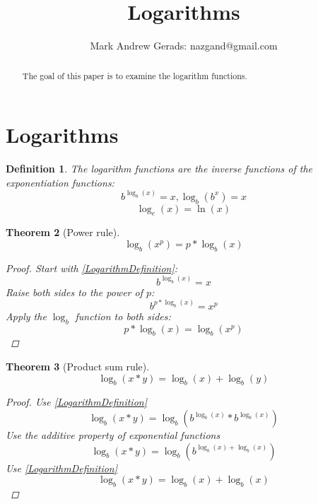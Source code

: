 \documentclass[]{article}
\author{Mark Andrew Gerads: nazgand@gmail.com}
\title{Logarithms}
\newcommand{\pqty}[1]{{\left(#1\right)}}
\newtheorem{theorem}{Theorem}[section]
\newtheorem{definition}[theorem]{Definition}
\numberwithin{equation}{section}
\begin{document}
	
	\maketitle
	
	\begin{abstract}
		The goal of this paper is to examine the logarithm functions.
	\end{abstract}
	
	\section{Logarithms}
	\begin{definition}
		The logarithm functions are the inverse functions of the exponentiation functions:
		\begin{equation}
			\label{LogarithmDefinition}
			b^{\log_b\pqty{x}}=x
			,
			\log_b\pqty{b^x}=x
		\end{equation}
		\begin{equation}
		\log_e\pqty{x}=\ln\pqty{x}
		\end{equation}
	\end{definition}

	\begin{theorem}[Power rule]
		\begin{equation}
		\log_b\pqty{x^p}=p*\log_b\pqty{x}
		\end{equation}
		\begin{proof}
			Start with \eqref{LogarithmDefinition}:
			\begin{equation}
			b^{\log_b\pqty{x}}=x
			\end{equation}
			Raise both sides to the power of \(p\):
			\begin{equation}
			b^{p*\log_b\pqty{x}}=x^p
			\end{equation}
			Apply the \(\log_b\) function to both sides:
			\begin{equation}
			p*\log_b\pqty{x}=\log_b\pqty{x^p}
			\end{equation}
		\end{proof}
	\end{theorem}

	\begin{theorem}[Product sum rule]
		\begin{equation}
		\log_b\pqty{x*y}=\log_b\pqty{x}+\log_b\pqty{y}
		\end{equation}
		\begin{proof}
			Use \eqref{LogarithmDefinition}
			\begin{equation}
			\log_b\pqty{x*y}=
			\log_b\pqty{b^{\log_b\pqty{x}}*b^{\log_b\pqty{x}}}
			\end{equation}
			Use the additive property of exponential functions
			\begin{equation}
			\log_b\pqty{x*y}=
			\log_b\pqty{b^{\log_b\pqty{x}+\log_b\pqty{x}}}
			\end{equation}
			Use \eqref{LogarithmDefinition}
			\begin{equation}
			\log_b\pqty{x*y}=
			\log_b\pqty{x}+\log_b\pqty{x}
			\end{equation}
		\end{proof}
	\end{theorem}
\end{document}
